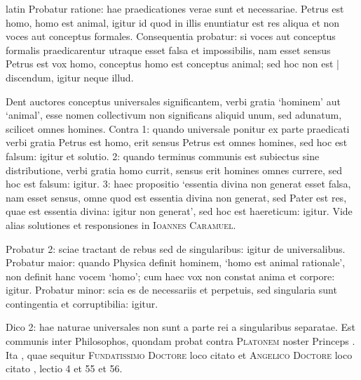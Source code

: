 \begin{otherlanguage*}{latin}
\pstart
Probatur ratione:
hae praedicationes verae sunt et necessariae. Petrus est homo, homo est animal, igitur id quod in illis enuntiatur est res aliqua et non voces aut conceptus formales. Consequentia probatur:
si voces aut conceptus formalis praedicarentur utraque esset falsa et impossibilis, nam esset sensus Petrus est vox homo, conceptus homo est conceptus animal; sed hoc non est \textnormal{|} discendum, igitur neque illud. 
\pend

\pstart
Dent auctores conceptus universales significantem, verbi gratia `hominem' aut `animal', esse nomen collectivum non significans aliquid unum, sed adunatum, scilicet omnes homines. Contra 1:
quando universale ponitur ex parte praedicati verbi gratia Petrus est homo, erit sensus Petrus est omnes homines, sed hoc est falsum:
igitur et solutio.  2:
quando terminus communis est subiectus sine distributione, verbi gratia homo currit, sensus erit homines omnes currere, sed hoc est falsum:
igitur.  3:
haec propositio `essentia divina non generat esset falsa, nam esset sensus, omne quod est essentia divina non generat, sed Pater est res, quae est essentia divina:
igitur non generat', sed hoc est haereticum:
igitur. Vide alias solutiones et responsiones in \textsc{Ioannes Caramuel}. 
\pend

\pstart
Probatur 2:
sciae tractant de rebus sed de singularibus:
igitur de universalibus. Probatur maior:
quando Physica definit hominem, `homo est animal rationale', non definit hanc vocem `homo'; cum haec vox non constat anima et corpore:
igitur. Probatur minor:
scia es de necessariis et perpetuis, sed singularia sunt contingentia et corruptibilia:
igitur. 
\pend

\pstart
Dico 2:
hae naturae universales non sunt a parte rei a singularibus separatae. Est communis inter Philosophos, quondam probat contra \textsc{Platonem} noster Princeps . Ita , quae sequitur \textsc{Fundatissimo Doctore} loco citato et \textsc{Angelico Doctore}\index[persons]{} loco citato , lectio 4 et  55 et 56. 
\pend


\end{otherlanguage*}
